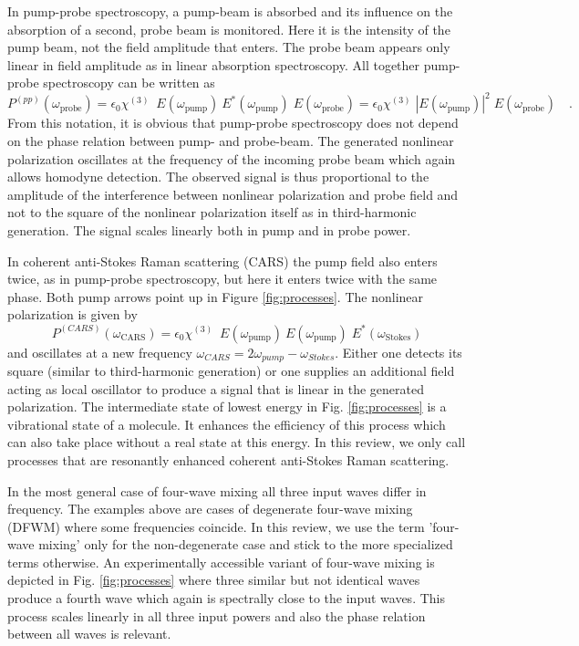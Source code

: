 In pump-probe spectroscopy, a pump-beam is absorbed and its influence on the absorption of a second, probe beam is monitored. Here it is the intensity of the pump beam, not the field amplitude that enters. The probe beam appears only linear in field amplitude as in linear absorption spectroscopy.
All together pump-probe spectroscopy can be written as
%
\begin{equation}
P^{(pp)}(\omega_{\text{probe}}) = 
\epsilon_0 \chi^{(3)} \; \ E(\omega_{\text{pump}}) \ E^*(\omega_{\text{pump}})  \; E(\omega_{\text{probe}}) 
=
\epsilon_0 \chi^{(3)} \; \left| E(\omega_{\text{pump}})  \right|^2 \; E(\omega_{\text{probe}})  
\quad .
\label{eq:chi3-pp}
\end{equation}
%
From this notation, it is obvious that pump-probe spectroscopy does not depend on the phase relation between pump- and probe-beam.
The generated nonlinear polarization oscillates at the frequency of the incoming probe beam which again allows homodyne detection. The observed signal is thus proportional to the amplitude of the interference between nonlinear polarization and probe field and not to the square of the nonlinear polarization itself as in third-harmonic generation. The  signal  scales linearly both  in pump and in probe power.


In coherent anti-Stokes Raman scattering (CARS) the pump field also enters twice, as in pump-probe spectroscopy, but here it enters twice with the same phase. Both pump arrows point up in Figure \ref{fig:processes}. The nonlinear polarization is given by 
%
\begin{equation}
P^{(CARS)}(\omega_{\text{CARS}}) = 
\epsilon_0 \chi^{(3)} \; \ E(\omega_{\text{pump}}) \ E(\omega_{\text{pump}})  \; E^*(\omega_{\text{Stokes}}) 
\label{eq:chi3-cars}
\end{equation}
%
and oscillates at a new frequency $\omega_{CARS} = 2 \omega_{pump} - \omega_{Stokes}$. Either one detects its square (similar to third-harmonic generation) or one supplies an additional field acting as local oscillator to produce a signal that is linear in the generated polarization. The intermediate state of lowest energy in Fig. \ref{fig:processes} is a vibrational state of a molecule. It enhances the efficiency of this process which can also take place without a real state at this energy. In this review, we only call processes that are resonantly enhanced coherent anti-Stokes Raman scattering.

In the most general case of four-wave mixing all three input waves differ in frequency. The examples {above} are cases of degenerate four-wave mixing (DFWM) where some frequencies coincide. In this review, we use the term 'four-wave mixing' only for the non-degenerate case and stick to the more specialized terms otherwise. An experimentally accessible variant of four-wave mixing is depicted in Fig. \ref{fig:processes} where three similar but not identical waves produce a fourth wave which again {is} spectrally close to the input waves. This process scales linearly in all three input powers and also the phase relation between all waves is relevant.

